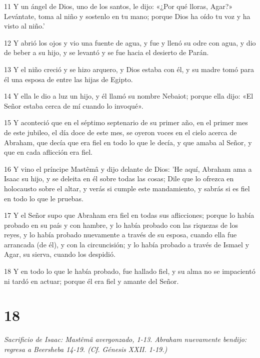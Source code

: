 \par 11 Y un ángel de Dios, uno de los santos, le dijo: «¿Por qué lloras, Agar?» Levántate, toma al niño y sostenlo en tu mano; porque Dios ha oído tu voz y ha visto al niño.'
\par 12 Y abrió los ojos y vio una fuente de agua, y fue y llenó su odre con agua, y dio de beber a su hijo, y se levantó y se fue hacia el desierto de Parán.
\par 13 Y el niño creció y se hizo arquero, y Dios estaba con él, y su madre tomó para él una esposa de entre las hijas de Egipto.
\par 14 Y ella le dio a luz un hijo, y él llamó su nombre Nebaiot; porque ella dijo: «El Señor estaba cerca de mí cuando lo invoqué».
\par 15 Y aconteció que en el séptimo septenario de su primer año, en el primer mes de este jubileo, el día doce de este mes, se oyeron voces en el cielo acerca de Abraham, que decía que era fiel en todo lo que le decía, y que amaba al Señor, y que en cada aflicción era fiel.
\par 16 Y vino el príncipe Mastêmâ y dijo delante de Dios: 'He aquí, Abraham ama a Isaac su hijo, y se deleita en él sobre todas las cosas; Dile que lo ofrezca en holocausto sobre el altar, y verás si cumple este mandamiento, y sabrás si es fiel en todo lo que le pruebas.
\par 17 Y el Señor supo que Abraham era fiel en todas sus aflicciones; porque lo había probado en su país y con hambre, y lo había probado con las riquezas de los reyes, y lo había probado nuevamente a través de su esposa, cuando ella fue arrancada (de él), y con la circuncisión; y lo había probado a través de Ismael y Agar, su sierva, cuando los despidió.
\par 18 Y en todo lo que le había probado, fue hallado fiel, y su alma no se impacientó ni tardó en actuar; porque él era fiel y amante del Señor.

\chapter{18}

\par \textit{Sacrificio de Isaac: Mastêmâ avergonzado, 1-13. Abraham nuevamente bendijo: regresa a Beersheba 14-19. (Cf. Génesis XXII. 1-19.)}

